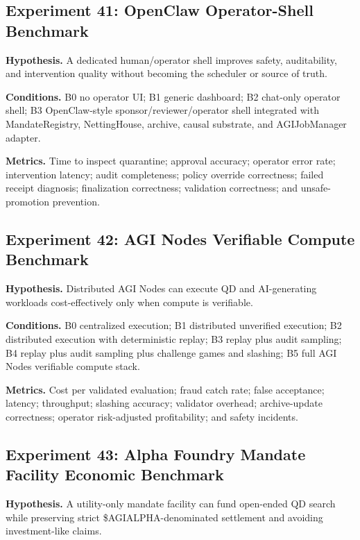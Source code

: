 \subsection{Experiment 41: OpenClaw Operator-Shell
Benchmark}\label{experiment-41-openclaw-operator-shell-benchmark}

\textbf{Hypothesis.} A dedicated human/operator shell improves safety,
auditability, and intervention quality without becoming the scheduler or
source of truth.

\textbf{Conditions.} B0 no operator UI; B1 generic dashboard; B2
chat-only operator shell; B3 OpenClaw-style sponsor/reviewer/operator
shell integrated with MandateRegistry, NettingHouse, archive, causal
substrate, and AGIJobManager adapter.

\textbf{Metrics.} Time to inspect quarantine; approval accuracy;
operator error rate; intervention latency; audit completeness; policy
override correctness; failed receipt diagnosis; finalization
correctness; validation correctness; and unsafe-promotion prevention.

\subsection{Experiment 42: AGI Nodes Verifiable Compute
Benchmark}\label{experiment-42-agi-nodes-verifiable-compute-benchmark}

\textbf{Hypothesis.} Distributed AGI Nodes can execute QD and
AI-generating workloads cost-effectively only when compute is
verifiable.

\textbf{Conditions.} B0 centralized execution; B1 distributed unverified
execution; B2 distributed execution with deterministic replay; B3 replay
plus audit sampling; B4 replay plus audit sampling plus challenge games
and slashing; B5 full AGI Nodes verifiable compute stack.

\textbf{Metrics.} Cost per validated evaluation; fraud catch rate; false
acceptance; latency; throughput; slashing accuracy; validator overhead;
archive-update correctness; operator risk-adjusted profitability; and
safety incidents.

\subsection{Experiment 43: Alpha Foundry Mandate Facility Economic
Benchmark}\label{experiment-43-alpha-foundry-mandate-facility-economic-benchmark}

\textbf{Hypothesis.} A utility-only mandate facility can fund open-ended
QD search while preserving strict \$AGIALPHA-denominated settlement and
avoiding investment-like claims.

